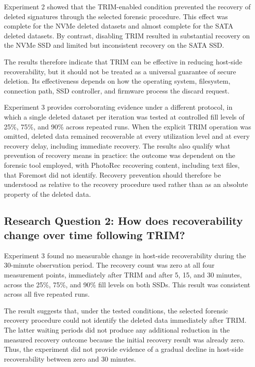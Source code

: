 Experiment 2 showed that the TRIM-enabled condition prevented the recovery of deleted signatures through the selected forensic procedure. This effect was complete for 
the NVMe deleted datasets and almost complete for the SATA deleted datasets. By contrast, disabling TRIM resulted in substantial recovery on the NVMe SSD and limited but 
inconsistent recovery on the SATA SSD.

The results therefore indicate that TRIM can be effective in reducing host-side recoverability, but it should not be treated as a universal guarantee of secure deletion. 
Its effectiveness depends on how the operating system, filesystem, connection path, SSD controller, and firmware process the discard request.

Experiment 3 provides corroborating evidence under a different protocol, in which a single deleted dataset per iteration was tested at controlled fill levels of 25\%, 
75\%, and 90\% across repeated runs. When the explicit TRIM operation was omitted, deleted data remained recoverable at every utilization level and at every recovery 
delay, including immediate recovery. The results also qualify what prevention of recovery means in practice: the outcome was dependent on the forensic tool employed, 
with PhotoRec recovering content, including text files, that Foremost did not identify. Recovery prevention should therefore be understood as relative to the recovery 
procedure used rather than as an absolute property of the deleted data.

\subsection*{Research Question 2: How does recoverability change over time following TRIM?}
Experiment 3 found no measurable change in host-side recoverability during the 30-minute observation period. The recovery count was zero at all four measurement points, 
immediately after TRIM and after 5, 15, and 30 minutes, across the 25\%, 75\%, and 90\% fill levels on both SSDs. This result was consistent across all five repeated 
runs.

The result suggests that, under the tested conditions, the selected forensic recovery procedure could not identify the deleted data immediately after TRIM. The latter 
waiting periods did not produce any additional reduction in the measured recovery outcome because the initial recovery result was already zero. Thus, the experiment 
did not provide evidence of a gradual decline in host-side recoverability between zero and 30 minutes.

